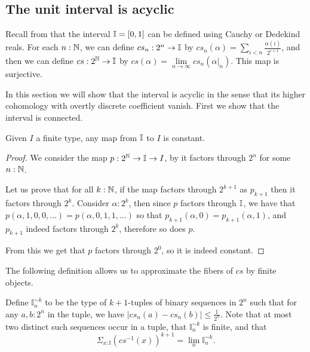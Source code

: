  
\subsection{The unit interval is acyclic}
\label{interval-acyclic}

Recall from \parencite[Section 4.4]{synthetic-stone-duality} that the interval $\mathbb{I} = [0,1]$ can be defined using Cauchy or Dedekind reals. For each $n:\mathbb{N}$, we can define $cs_n: 2^n \to \mathbb{I}$ by $cs_n(\alpha) = \sum\limits_{i<n} \frac{\alpha(i)}{2^{i+1}}$, and then we can define $cs: 2^{\mathbb{N}} \to \mathbb{I}$ by $cs(\alpha) = \lim\limits_{n\to\infty} cs_n(\alpha|_n)$. This map is surjective.

In this section we will show that the interval is acyclic in the sense that its higher cohomology with overtly discrete coefficient vanish. First we show that the interval is connected.

\begin{lemma}\label{interval-connected}
Given $I$ a finite type, any map from $\mathbb{I}$ to $I$ is constant.
\end{lemma}

\begin{proof}
We consider the map $p : 2^{\mathbb{N}}\to\mathbb{I}\to I$, by  it factors through $2^n$ for some $n:\mathbb{N}$. 

Let us prove that for all $k:\mathbb{N}$, if the map factors through $2^{k+1}$ as $p_{k+1}$ then it factors through $2^k$. Consider $\alpha:2^k$, then since $p$ factors through $\mathbb{I}$, we have that $p(\alpha,1,0,0,\hdots) = p(\alpha,0,1,1,\hdots)$ so that $p_{k+1}(\alpha,0) = p_{k+1}(\alpha,1)$, and $p_{k+1}$ indeed factors through $2^k$, therefore so does $p$.

From this we get that $p$ factors through $2^0$, so it is indeed constant.
\end{proof}

The following definition allows us to approximate the fibers of $cs$ by finite objects.

\begin{definition}\label{description-Cn-simn}
  Define $\mathbb I_n^{\sim k}$ to be 
  the type of $k+1$-tuples of binary sequences in $2^n$ such that for any $a,b:2^n$ in the tuple, we have 
  $|cs_n (a) -cs_n(b) |\leq\frac1{2^n}$. 
  Note that at most two distinct such sequences occur in a tuple, that 
  $\mathbb I_n^{\sim k}$ is finite, and that
  $$\Sigma_{x : \mathbb I} (cs^{-1}(x))^{k+1} = \lim_{n} \mathbb I_n^{\sim k}.$$
\end{definition}

